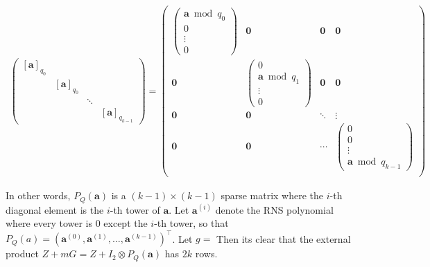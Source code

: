 \begin{gather*}
\begin{pmatrix}
            [\mathbf{a}]_{q_0}  \\
            & [\mathbf{a}]_{q_0} \\
            & & \ddots \\
            & & & [\mathbf{a}]_{q_{k-1}}
        \end{pmatrix} = 
        \begin{pmatrix}
            \begin{pmatrix}
                \mathbf{a}\bmod{q_0} \\
                0 \\
                \vdots \\
                0
            \end{pmatrix} & \mathbf{0} & \mathbf{0} & \mathbf{0} \\
            \mathbf{0} & \begin{pmatrix}
                0 \\
                \mathbf{a}\bmod{q_1} \\
                \vdots \\
                0
            \end{pmatrix} & \mathbf{0} & \mathbf{0} \\
            \mathbf{0} & \mathbf{0} & \ddots & \vdots \\
            \mathbf{0} & \mathbf{0} & \cdots & \begin{pmatrix}
                0 \\
                0 \\
                \vdots \\
                \mathbf{a}\bmod{q_{k-1}}
            \end{pmatrix} \\
        \end{pmatrix}
    \end{gather*}
    
    \let\coef\undefined
    
    \newpage
    
    In other words, $P_Q(\mathbf{a})$ is a $(k-1)\times (k-1)$ sparse matrix where the $i$-th diagonal element is the $i$-th tower of $\mathbf{a}$. Let $\mathbf{a}^{(i)}$ denote the RNS polynomial where every tower is 0 except the $i$-th tower, so that $P_Q(a) = (\mathbf{a}^{(0)}, \mathbf{a}^{(1)}, \dots, \mathbf{a}^{(k-1)})^\intercal$. Let $g = $ Then its clear that the external product $Z + mG = Z + I_2\otimes P_Q(\mathbf{a})$ has $2k$ rows.
    
